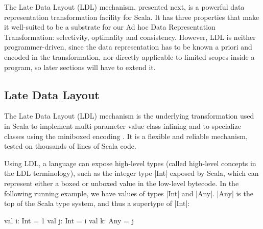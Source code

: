 The Late Data Layout (LDL) mechanism, presented next, is a powerful data
representation transformation facility for Scala.  It has three
properties that make it well-suited to be a substrate for our Ad hoc
Data Representation Transformation: selectivity, optimality and
consistency. However, LDL is neither programmer-driven, since the
data representation has to be known a priori and encoded in the
transformation, nor directly applicable to limited scopes inside a program,
so later sections will have to extend it.


\subsection{Late Data Layout}

The Late Data Layout (LDL) mechanism \cite{ldl} is the underlying transformation used in Scala to implement multi-parameter value class inlining and to specialize classes using the miniboxed encoding \cite{miniboxing}. It is a flexible and reliable mechanism, tested on thousands of lines of Scala code.



Using LDL, a language can expose high-level types (called high-level concepts in the LDL terminology), such as the integer type |Int| exposed by Scala, which can represent either a boxed or unboxed value in the low-level bytecode. In the following running example, we have values of types |Int| and |Any|. |Any| is the top of the Scala type system, and thus a supertype of |Int|:

\begin{lstlisting-nobreak}
val i: Int = 1
val j: Int = i
val k: Any = j
\end{lstlisting-nobreak}


